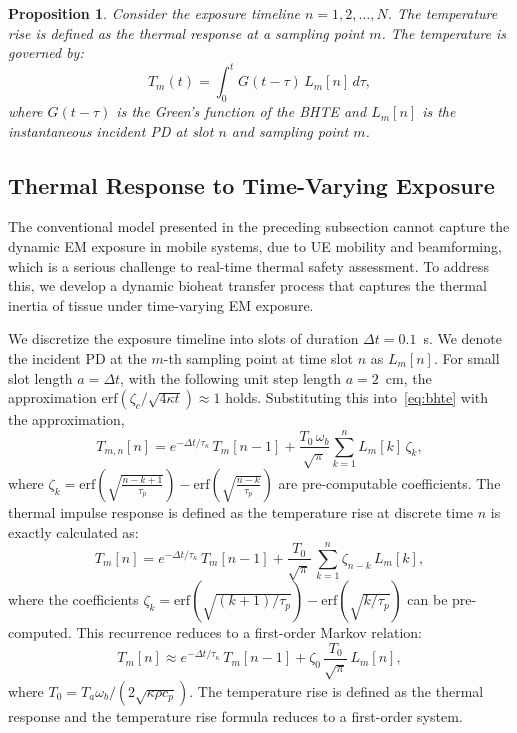 \documentclass[journal]{IEEEtran}
\newtheorem{proposition}{Proposition}
\begin{document}
\begin{proposition}
Consider the exposure timeline $n = 1, 2, \ldots, N$. The temperature rise is defined as the thermal response at a sampling point $m$. The temperature is governed by:
\begin{equation}
    T_m(t) = \int_0^t G(t - \tau)\,L_m[n]\,d\tau,
    \label{eq:Tm_int}
\end{equation}
where $G(t - \tau)$ is the Green's function of the BHTE and $L_m[n]$ is the instantaneous incident PD at slot $n$ and sampling point $m$.
\end{proposition}

\subsection{Thermal Response to Time-Varying Exposure}

The conventional model presented in the preceding subsection cannot capture the dynamic EM exposure in mobile systems, due to UE mobility and beamforming, which is a serious challenge to real-time thermal safety assessment. To address this, we develop a dynamic bioheat transfer process that captures the thermal inertia of tissue under time-varying EM exposure.

We discretize the exposure timeline into slots of duration $\Delta t = 0.1$~s. We denote the incident PD at the $m$-th sampling point at time slot $n$ as $L_m[n]$. For small slot length $a = \Delta t$, with the following unit step length $a = 2$~cm, the approximation $\mathrm{erf}(\zeta_c/\sqrt{4\kappa t}) \approx 1$ holds. Substituting this into~\eqref{eq:bhte} with the approximation,
\begin{equation}
    T_{m,n}[n] = e^{-\Delta t/\tau_{\kappa}}\,T_m[n-1]
    + \frac{T_0\,\omega_b}{\sqrt{\pi}}\sum_{k=1}^{n} L_m[k]\,\zeta_k,
    \label{eq:Tmn}
\end{equation}
where $\zeta_k = \mathrm{erf}\!\left(\sqrt{\frac{n - k + 1}{\tau_p}}\right) - \mathrm{erf}\!\left(\sqrt{\frac{n - k}{\tau_p}}\right)$ are pre-computable coefficients. The thermal impulse response is defined as the temperature rise at discrete time $n$ is exactly calculated as:
\begin{equation}
    T_m[n] = e^{-\Delta t / \tau_{\kappa}}\,T_m[n-1] + \frac{T_0}{\sqrt{\pi}}\,\sum_{k=1}^{n}\zeta_{n-k}\,L_m[k],
    \label{eq:Tm_disc}
\end{equation}
where the coefficients $\zeta_k = \mathrm{erf}(\sqrt{(k+1)/\tau_p}) - \mathrm{erf}(\sqrt{k/\tau_p})$ can be pre-computed. This recurrence reduces to a first-order Markov relation:
\begin{equation}
    T_m[n] \approx e^{-\Delta t/\tau_\kappa}\,T_m[n-1] + \zeta_0\,\frac{T_0}{\sqrt{\pi}}\,L_m[n],
    \label{eq:T_markov}
\end{equation}
where $T_0 = T_a\omega_b / (2\sqrt{\kappa\rho c_p})$. The temperature rise is defined as the thermal response and the temperature rise formula reduces to a first-order system.
\end{document}
